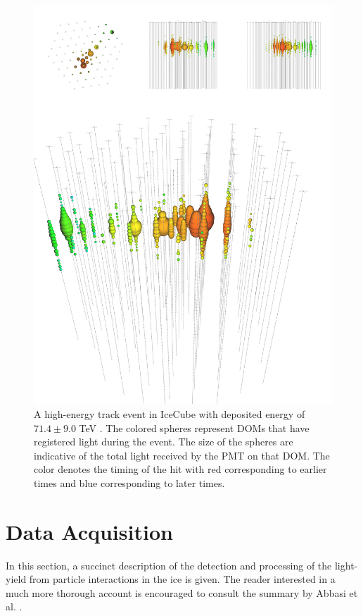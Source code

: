 \documentclass{gatech-thesis}
\begin{document}
\begin{figure}[ht]
  \begin{center}
    \includegraphics[width=1.0\textwidth,keepaspectratio]{hese_track_event.png}
  \end{center}
  \caption{A high-energy track event in IceCube with deposited energy of $71.4 \pm 9.0$ TeV \cite{2013Sci...342E...1I}. The colored spheres represent DOMs that have registered light during the event. The size of the spheres are indicative of the total light received by the PMT on that DOM. The color denotes the timing of the hit with red corresponding to earlier times and blue corresponding to later times.}
  \label{fig:track}
\end{figure}


\chapter{Data Acquisition}
In this section, a succinct description of the detection and processing of the light-yield from particle interactions in the ice is given. The reader interested in a much more thorough account is encouraged to consult the summary by Abbasi et al. \cite{2009NIMPA.601..294A}.
\end{document}
